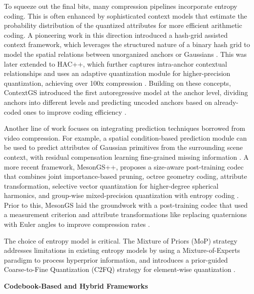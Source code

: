 \documentclass[11pt]{article}
\begin{document}
To squeeze out the final bits, many compression pipelines incorporate entropy coding. This is often enhanced by sophisticated context models that estimate the probability distribution of the quantized attributes for more efficient arithmetic coding. A pioneering work in this direction introduced a hash-grid assisted context framework, which leverages the structured nature of a binary hash grid to model the spatial relations between unorganized anchors or Gaussians \cite{ref438}. This was later extended to HAC++, which further captures intra-anchor contextual relationships and uses an adaptive quantization module for higher-precision quantization, achieving over 100x compression \cite{ref439}. Building on these concepts, ContextGS introduced the first autoregressive model at the anchor level, dividing anchors into different levels and predicting uncoded anchors based on already-coded ones to improve coding efficiency \cite{ref440}.

Another line of work focuses on integrating prediction techniques borrowed from video compression. For example, a spatial condition-based prediction module can be used to predict attributes of Gaussian primitives from the surrounding scene context, with residual compensation learning fine-grained missing information \cite{ref441}. A more recent framework, MesonGS++, proposes a size-aware post-training codec that combines joint importance-based pruning, octree geometry coding, attribute transformation, selective vector quantization for higher-degree spherical harmonics, and group-wise mixed-precision quantization with entropy coding \cite{ref442}. Prior to this, MesonGS laid the groundwork with a post-training codec that used a measurement criterion and attribute transformations like replacing quaternions with Euler angles to improve compression rates \cite{ref443}.

The choice of entropy model is critical. The Mixture of Priors (MoP) strategy addresses limitations in existing entropy models by using a Mixture-of-Experts paradigm to process hyperprior information, and introduces a prior-guided Coarse-to-Fine Quantization (C2FQ) strategy for element-wise quantization \cite{ref444}.

\textbf{Codebook-Based and Hybrid Frameworks}
\end{document}
